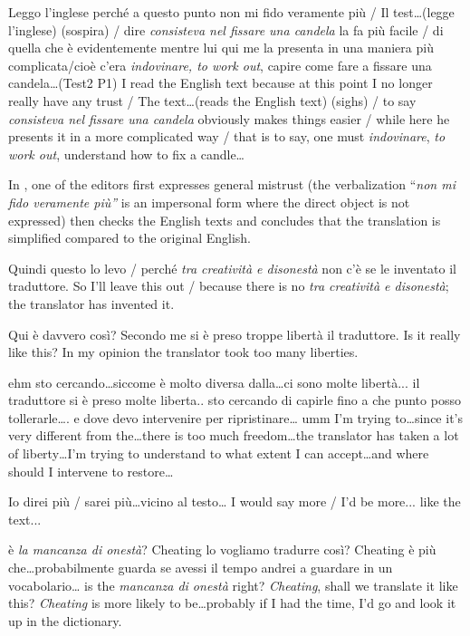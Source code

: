 \documentclass[output=paper]{LSP/langsci}
\begin{document}
\ea \label{troqe-marchan:ex:18} 
\glt Leggo l'inglese perché a questo punto non mi fido veramente più / Il test\ldots  (legge l'inglese) (sospira) / dire \textit{consisteva nel fissare una candela} la fa più facile / di quella che è evidentemente mentre lui qui me la presenta in una maniera più complicata/cioè c'era \textit{indovinare, to work out}, capire come fare a fissare una candela\ldots  (Test2 P1)
\glt I read the English text because at this point I no longer really have any trust / The text\ldots  (reads the English text) (sighs) / to say \textit{consisteva nel fissare una candela} obviously makes things easier / while here he presents it in a more complicated way / that is to say, one must \textit{indovinare}, \textit{to work out}, understand how to fix a candle\ldots 
\z

In , one of the editors first expresses general mistrust (the  verbalization ``\textit{non mi fido veramente più''} is an impersonal form where the direct object is not expressed) then checks the English texts and concludes that the  translation is simplified compared to the original English. 

\ea \label{troqe-marchan:ex:19} 
\glt Quindi questo lo levo / perché \textit{tra creatività e disonestà} non c'è se le inventato il traduttore.
\glt So I'll leave this out / because there is no \textit{tra creatività e disonestà}; the translator has invented it. 
\z 

\ea \label{troqe-marchan:ex:20} 
\glt Qui è davvero così? Secondo me si è preso troppe libertà il traduttore.
\glt Is it really like this? In my opinion the translator took too many liberties.
\z 

\ea \label{troqe-marchan:ex:21} 
\glt ehm sto cercando\ldots  siccome è molto diversa dalla\ldots  ci sono molte libertà... il traduttore si è preso molte liberta.. sto cercando di capirle fino a che punto posso tollerarle\ldots . e dove devo intervenire per ripristinare\ldots 
\glt umm I'm trying to\ldots  since it's very different from the\ldots  there is too much freedom\ldots  the translator has taken a lot of liberty\ldots  I'm trying to understand to what extent I can accept\ldots  and where should I intervene to restore\ldots  
\z

\ea \label{troqe-marchan:ex:22} 
\glt Io direi più / sarei più\ldots  vicino al testo\ldots  
\glt I would say more / I'd be more... like the text...
\z 

\ea \label{troqe-marchan:ex:23} 
\glt è \textit{la mancanza di onestà}? Cheating lo vogliamo tradurre così? Cheating è più che\ldots  probabilmente guarda se avessi il tempo andrei a guardare in un vocabolario\ldots 
\glt is the \textit{mancanza di onestà} right? \textit{Cheating}, shall we translate it like this? \textit{Cheating} is more likely to be\ldots  probably if I had the time, I'd go and look it up in the dictionary.
\z 
\end{document}
